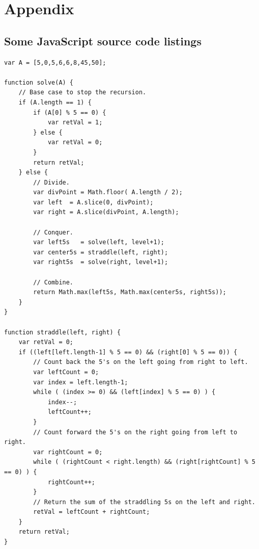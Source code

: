 \documentclass[10pt]{article}
\begin{document}
\pagebreak


\section{Appendix}

\subsection{Some JavaScript source code listings}

\lstset{numbers=left, numberstyle=\tiny, stepnumber=1, numbersep=5pt, basicstyle=\footnotesize\ttfamily}
\begin{lstlisting}[frame=single, ]  
var A = [5,0,5,6,6,8,45,50];

function solve(A) {
    // Base case to stop the recursion.
    if (A.length == 1) {
        if (A[0] % 5 == 0) {
            var retVal = 1;
        } else {
            var retVal = 0;
        }
        return retVal;
    } else {
        // Divide.
        var divPoint = Math.floor( A.length / 2);
        var left  = A.slice(0, divPoint);
        var right = A.slice(divPoint, A.length);
        
        // Conquer.
        var left5s   = solve(left, level+1);
        var center5s = straddle(left, right);
        var right5s  = solve(right, level+1);             
        
        // Combine.
        return Math.max(left5s, Math.max(center5s, right5s));
    }
}

function straddle(left, right) {
    var retVal = 0;
    if ((left[left.length-1] % 5 == 0) && (right[0] % 5 == 0)) {
        // Count back the 5's on the left going from right to left.
        var leftCount = 0;
        var index = left.length-1;
        while ( (index >= 0) && (left[index] % 5 == 0) ) {
            index--;
            leftCount++;
        }
        // Count forward the 5's on the right going from left to right.
        var rightCount = 0;
        while ( (rightCount < right.length) && (right[rightCount] % 5 == 0) ) {
            rightCount++;
        }
        // Return the sum of the straddling 5s on the left and right.
        retVal = leftCount + rightCount;
    }
    return retVal;
}
\end{lstlisting}
\end{document}
